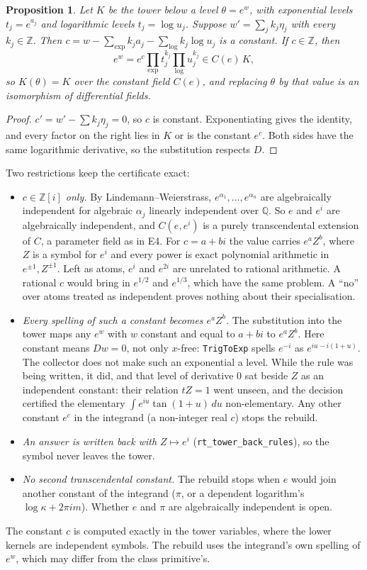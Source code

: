 \documentclass[11pt]{article}
\newtheorem{proposition}[theorem]{Proposition}
\theoremstyle{definition}
\theoremstyle{remark}
\newcommand{\Q}{\mathbb{Q}}
\newcommand{\Z}{\mathbb{Z}}
\newcommand{\code}[1]{\texttt{#1}}
\begin{document}
\begin{proposition}\label{prop:T16}
Let $K$ be the tower below a level $\theta=e^{w}$, with exponential levels $t_j=e^{a_j}$ and
logarithmic levels $t_j=\log u_j$. Suppose $w'=\sum_j k_j\eta_j$ with every $k_j\in\Z$.
Then $c=w-\sum_{\exp}k_ja_j-\sum_{\log}k_j\log u_j$ is a constant. If $c\in\Z$, then
\[ e^{w}=e^{c}\prod_{\exp}t_j^{k_j}\prod_{\log}u_j^{k_j}\in C(e)\,K, \]
so $K(\theta)=K$ over the constant field $C(e)$, and replacing $\theta$ by that value is an
isomorphism of differential fields.
\end{proposition}
\begin{proof}
$c'=w'-\sum k_j\eta_j=0$, so $c$ is constant. Exponentiating gives the identity, and every
factor on the right lies in $K$ or is the constant $e^{c}$. Both sides have the same
logarithmic derivative, so the substitution respects $D$.
\end{proof}
\noindent Two restrictions keep the certificate exact:
\begin{itemize}
\item \emph{$c\in\Z[i]$ only.} By Lindemann--Weierstrass, $e^{\alpha_1},\dots,e^{\alpha_n}$
  are algebraically independent for algebraic $\alpha_j$ linearly independent over $\Q$.
  So $e$ and $e^{i}$ are algebraically independent, and $C(e,e^{i})$ is a purely
  transcendental extension of $C$, a parameter field as in E4. For $c=a+bi$ the value
  carries $e^{a}Z^{b}$, where $Z$ is a symbol for $e^{i}$ and every power is exact
  polynomial arithmetic in $e^{\pm1},Z^{\pm1}$. Left as atoms, $e^{i}$ and $e^{2i}$ are
  unrelated to rational arithmetic. A rational $c$ would bring in $e^{1/2}$ and
  $e^{1/3}$, which have the same problem. A ``no'' over atoms treated as independent
  proves nothing about their specialisation.
\item \emph{Every spelling of such a constant becomes $e^{a}Z^{b}$.} The substitution
  into the tower maps any $e^{w}$ with $w$ constant and equal to $a+bi$ to $e^{a}Z^{b}$.
  Here constant means $Dw=0$, not only $x$-free: \code{TrigToExp} spells $e^{-i}$ as
  $e^{iu-i(1+u)}$. The collector does not make such an exponential a level. While the
  rule was being written, it did, and that level of derivative $0$ sat beside $Z$ as an
  independent constant: their relation $tZ=1$ went unseen, and the decision certified
  the elementary $\int e^{iu}\tan(1+u)\,du$ non-elementary. Any other constant $e^{c}$
  in the integrand (a non-integer real $c$) stops the rebuild.
\item \emph{An answer is written back with $Z\mapsto e^{i}$}
  (\code{rt\_tower\_back\_rules}), so the symbol never leaves the tower.
\item \emph{No second transcendental constant.} The rebuild stops when $e$ would join
  another constant of the integrand ($\pi$, or a dependent logarithm's $\log\kappa+2\pi i m$).
  Whether $e$ and $\pi$ are algebraically independent is open.
\end{itemize}
The constant $c$ is computed exactly in the tower variables, where the lower kernels are
independent symbols. The rebuild uses the integrand's own spelling of $e^{w}$, which may
differ from the class primitive's.
\end{document}

